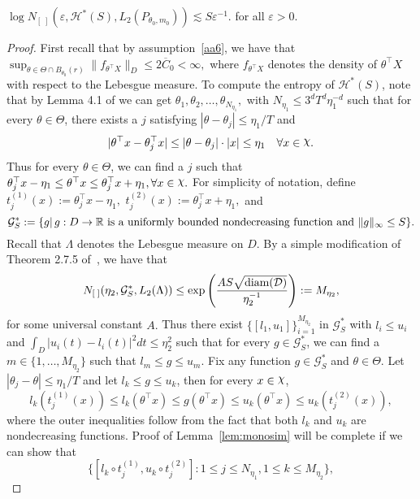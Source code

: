 {\begin{lemma}\label{lem:monosim}   $\log N_{[\;]}(\varepsilon, \mathcal{H}^*(S), L_2(P_{\theta_0, m_0})) \lesssim S \varepsilon^{-1}.$ for all $\varepsilon >0.$
\end{lemma}
\begin{proof}
First recall that by assumption~\ref{aa6}, { we have that  $ \sup_{\theta\in \Theta \cap B_{\theta_0}(r)} \|f_{\theta^\top X}\|_D \le2\overline{C}_0 < \infty,$} where $f_{\theta^\top X}$ denotes the density of ${\theta^\top X}$ with respect to the Lebesgue measure.  To compute the entropy of $\mathcal{H}^*(S)$, note that by Lemma 4.1 of \cite{Pollard90} we can get $\theta_1, \theta_2, \ldots, \theta_{N_{\eta_1}},$ with $N_{\eta_1}\le 3^d T^d \eta_1^{-d}$ such that for every $\theta\in\Theta$, there exists a $j$ satisfying $|\theta - \theta_j|\le \eta_1/T$ and
\[
|\theta^{\top}x - \theta_j^{\top}x| \le |\theta - \theta_j|\cdot|x| \le \eta_1\quad \forall x\in\rchi.
\]
Thus for every $\theta\in\Theta$, we can find a $j$ such that $\theta_j^{\top}x - \eta_1 \le \theta^{\top}x \le \theta_j^{\top}x + \eta_1, \forall x\in \rchi.$  For simplicity of notation, define
$t_j^{(1)}(x) := \theta_j^{\top}x - \eta_1,$ $t_j^{(2)}(x) := \theta_j^{\top}x + \eta_1,$
and
\[\mathcal{G}^*_S:=\{g|\, g:D\to \mathbb{R} \text{ is a uniformly bounded nondecreasing function and }  \|g\|_\infty \le S \}.\]  Recall that $\Lambda$ denotes the Lebesgue measure on $D$. By a simple modification of Theorem 2.7.5 of~\cite{VdVW96}, we have that \[
  N_{[\;]}(\eta_2, \mathcal{G}^*_S, L_2(\Lambda)) \le \exp\left(\frac{A S \sqrt{\text{diam}(\mathcal{D})}}{\eta_2^{-1}}\right):=  M_{\eta_2},
\] for some universal constant $A.$ Thus there exist $\{[l_1, u_1]\}_{i=1}^{M_{\eta_2}}$  in $ \mathcal{G}^*_S$ with $l_i\le u_i$ and $\int_D |u_i(t) - l_i(t)|^2 dt \le \eta_2^2$  such that for every $g\in\mathcal{G}^*_S$, we can find a $m\in  \{1, \ldots,M_{\eta_2}\}$ such that $l_m \le g \le u_m$. Fix any function $g\in\mathcal{G}^*_S$ and $\theta\in\Theta$. Let $|\theta_j - \theta| \le \eta_1/T$ and let $l_k \le g \le u_k$, then for every $x\in\rchi$,
\[
l_k(t_j^{(1)}(x)) \le l_k(\theta^{\top}x) \le g(\theta^{\top}x) \le u_k(\theta^{\top}x) \le u_k(t_j^{(2)}(x)),
\]
where the outer inequalities follow from the fact that both $l_k$ and $u_k$ are nondecreasing functions. Proof of Lemma~\ref{lem:monosim} will be complete if we can show that
\[
\{[l_k\circ t_j^{(1)}, u_k\circ t_j^{(2)}]: 1\le j\le N_{\eta_1}, 1\le k\le M_{\eta_2}\},
\]
\end{proof}}
